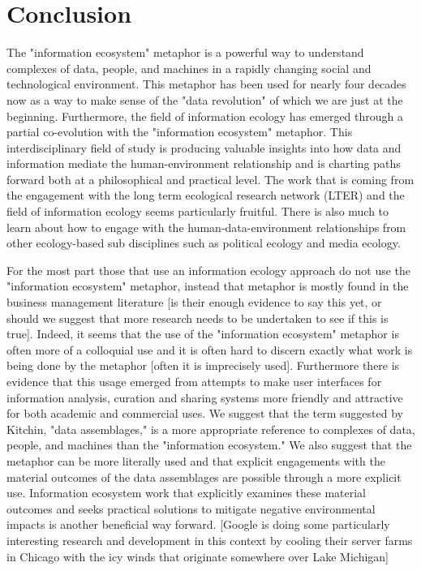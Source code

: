 \section{Conclusion}

The "information ecosystem" metaphor is a powerful way to understand complexes of data, people, and machines in a rapidly changing social and technological environment. This metaphor has been used for nearly four decades now as a way to make sense of the "data revolution" of which we are just at the beginning. Furthermore, the field of information ecology has emerged through a partial co-evolution with the "information ecosystem" metaphor. This interdisciplinary field of study is producing valuable insights into how data and information mediate the human-environment relationship and is charting paths forward both at a philosophical and practical level. The work that is coming from the engagement with the long term ecological research network (LTER) and the field of information ecology seems particularly fruitful. There is also much to learn about how to engage with the human-data-environment relationships from other ecology-based sub disciplines such as political ecology and media ecology. 

For the most part those that use an information ecology approach do not use the "information ecosystem" metaphor, instead that metaphor is mostly found in the business management literature [is their enough evidence to say this yet, or should we suggest that more research needs to be undertaken to see if this is true]. Indeed, it seems that the use of the "information ecosystem" metaphor is often more of a colloquial use and it is often hard to discern exactly what work is being done by the metaphor [often it is imprecisely used]. Furthermore there is evidence that this usage emerged from attempts to make user interfaces for information analysis, curation and sharing systems more friendly and attractive for both academic and commercial uses. We suggest that the term suggested by Kitchin, "data assemblages," is a more appropriate reference to complexes of data, people, and machines than the "information ecosystem." We also suggest that the metaphor can be more literally used and that explicit engagements with the material outcomes of the data assemblages are possible through a more explicit use. Information ecosystem work that explicitly examines these material outcomes and seeks practical solutions to mitigate negative environmental impacts is another beneficial way forward. [Google is doing some particularly interesting research and development in this context by cooling their server farms in Chicago with the icy winds that originate somewhere over Lake Michigan]

